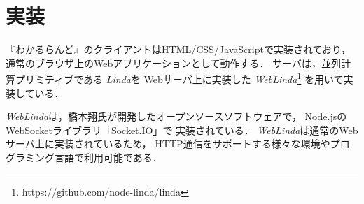 \section{実装}

『わかるらんど』のクライアントは\url{HTML/CSS/JavaScript}で実装されており，
通常のブラウザ上のWebアプリケーションとして動作する．
サーバは，並列計算プリミティブである
\textit{Linda}\cite{Carriero:1989:LC:63334.63337}を
Webサーバ上に実装した
\textit{WebLinda}\cite{shokai_furnitue}\footnote{https://github.com/node-linda/linda}
を用いて実装している．

\textit{WebLinda}は，橋本翔氏が開発したオープンソースソフトウェアで，
Node.jsの
WebSocketライブラリ「Socket.IO」で
実装されている．
\textit{WebLinda}は通常のWebサーバ上に実装されているため，
HTTP通信をサポートする様々な環境やプログラミング言語で利用可能である．